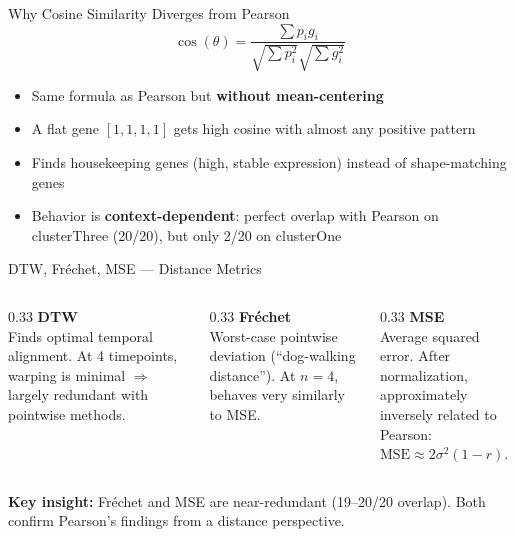 \documentclass[aspectratio=169,12pt,handout]{beamer}
\begin{document}
\begin{frame}{Why Cosine Similarity Diverges from Pearson}
$$\cos(\theta) = \frac{\sum p_i g_i}{\sqrt{\sum p_i^2}\sqrt{\sum g_i^2}}$$

\begin{itemize}
  \item Same formula as Pearson but \textbf{without mean-centering}
  \item A flat gene $[1, 1, 1, 1]$ gets high cosine with almost any positive pattern
  \item Finds housekeeping genes (high, stable expression) instead of shape-matching genes
  \item Behavior is \textbf{context-dependent}: perfect overlap with Pearson on clusterThree (20/20),
        but only 2/20 on clusterOne
\end{itemize}
\end{frame}

\begin{frame}{DTW, Fr\'{e}chet, MSE --- Distance Metrics}
\begin{columns}[T]
\begin{column}{0.33\textwidth}
\textbf{DTW}\\[0.5em]
Finds optimal temporal alignment.
At 4 timepoints, warping is minimal
$\Rightarrow$ largely redundant with pointwise methods.
\end{column}
\begin{column}{0.33\textwidth}
\textbf{Fr\'{e}chet}\\[0.5em]
Worst-case pointwise deviation
(``dog-walking distance'').
At $n=4$, behaves very similarly to MSE.
\end{column}
\begin{column}{0.33\textwidth}
\textbf{MSE}\\[0.5em]
Average squared error.
After normalization, approximately
inversely related to Pearson:\\
$\text{MSE} \approx 2\sigma^2(1-r)$.
\end{column}
\end{columns}

\vspace{1em}
\textbf{Key insight:} Fr\'{e}chet and MSE are near-redundant (19--20/20 overlap).
Both confirm Pearson's findings from a distance perspective.
\end{frame}
\end{document}

